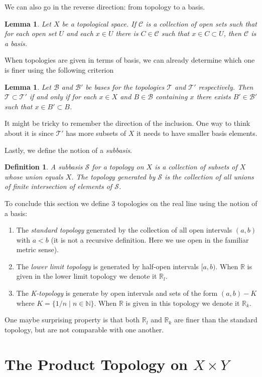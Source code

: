 \documentclass{article}
\newcommand{\Ba}{\mathcal{B}}
\newcommand{\Ta}{\mathcal{T}}
\newcommand{\R}{\mathbb{R}}
\newcommand{\N}{\mathbb{N}}
\newcommand{\Ss}{\mathcal{S}} %
\newtheorem{lemma}[theorem]{Lemma}
\newtheorem*{definition}{Definition}
\theoremstyle{remark}
\begin{document}
We can also go in the reverse direction: from topology to a basis.
\begin{lemma}
    Let $X$ be a topological space. If $\mathcal{C}$ is a collection of open sets such that for each open set $U$ and each $x\in U$ there is $C\in\mathcal{C}$ such that $x\in C\subset U$, then $\mathcal{C}$ is a basis.
\end{lemma}

When topologies are given in terms of basis, we can already determine which one is finer using the following criterion
\begin{lemma}
    Let $\Ba$ and $\Ba'$ be bases for the topologies $\Ta$ and $\Ta'$ respectively. Then
    $\Ta\subset\Ta'$ if and only if for each $x\in X$ and $B\in\Ba$ containing $x$ there exists $B'\in\Ba'$ such that $x\in B'\subset B$.
\end{lemma}
It might be tricky to remember the direction of the inclusion. One way to think about it is since $\Ta'$ has more subsets of $X$ it needs to have smaller basis elements.

Lastly, we define the notion of a \textit{subbasis}.
\begin{definition}
    A subbasis $\Ss$ for a topology on $X$ is a collection of subsets of $X$ whose union equals $X$. The topology generated by $\Ss$ is the collection of all unions of finite intersection of elements of $\Ss$.
\end{definition}

To conclude this section we define 3 topologies on the real line using the notion of a basis:
\begin{enumerate}
    \item The \textit{standard topology} generated by the collection of all open intervals $(a,b)$ with $a<b$ (it is not a recursive definition. Here we use open in the familiar metric sense).
    \item The \textit{lower limit topology} is generated by half-open intervals $[a,b)$. When $\R$ is given in the lower limit topology we denote it $\R_l$.
    \item The \textit{K-topology} is generate by open intervals and sets of the form $(a,b)-K$ where $K=\{1/n\mid n\in\N\}$. When $\R$ is given in this topology we denote it $\R_k$.
\end{enumerate}
One maybe surprising property is that both $\R_l$ and $\R_k$ are finer than the standard topology, but are not comparable with one another.

\section{The Product Topology on $X\times Y$}
\end{document}
